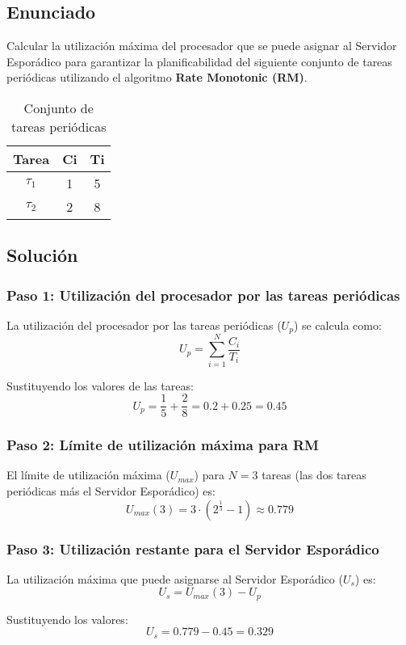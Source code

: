 \documentclass[a4paper,12pt]{article}
\begin{document}
\subsection{Enunciado}
Calcular la utilización máxima del procesador que se puede asignar al Servidor Esporádico para garantizar la planificabilidad del siguiente conjunto de tareas periódicas utilizando el algoritmo \textbf{Rate Monotonic (RM)}.

\begin{table}[H]
\centering
\begin{tabular}{|c|c|c|}
\hline
\textbf{Tarea} & \textbf{Ci} & \textbf{Ti} \\ \hline
$\tau_1$ & 1 & 5 \\ \hline
$\tau_2$ & 2 & 8 \\ \hline
\end{tabular}
\caption{Conjunto de tareas periódicas}
\end{table}

\subsection{Solución}
\subsubsection{Paso 1: Utilización del procesador por las tareas periódicas}
La utilización del procesador por las tareas periódicas (\(U_p\)) se calcula como:
\[
U_p = \sum_{i=1}^{N} \frac{C_i}{T_i}
\]

Sustituyendo los valores de las tareas:
\[
U_p = \frac{1}{5} + \frac{2}{8} = 0.2 + 0.25 = 0.45
\]

\subsubsection{Paso 2: Límite de utilización máxima para RM}
El límite de utilización máxima (\(U_{max}\)) para \(N = 3\) tareas (las dos tareas periódicas más el Servidor Esporádico) es:
\[
U_{max}(3) = 3 \cdot (2^{\frac{1}{3}} - 1) \approx 0.779
\]

\subsubsection{Paso 3: Utilización restante para el Servidor Esporádico}
La utilización máxima que puede asignarse al Servidor Esporádico (\(U_s\)) es:
\[
U_s = U_{max}(3) - U_p
\]

Sustituyendo los valores:
\[
U_s = 0.779 - 0.45 = 0.329
\]
\end{document}

